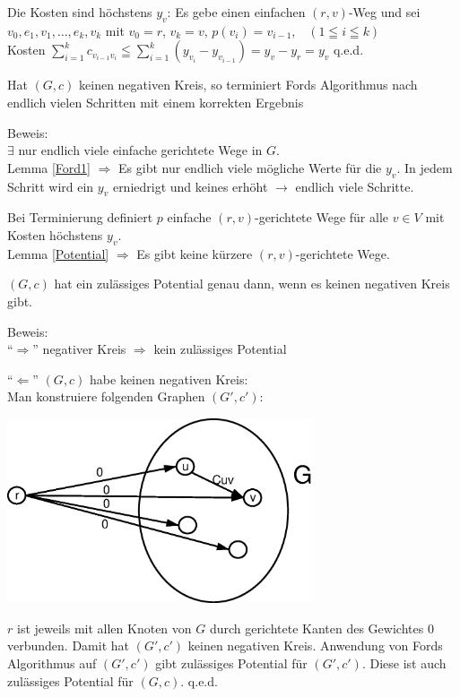 Die Kosten sind höchstens $y_{v}$:
Es gebe einen einfachen $(r,v)$-Weg und sei $v_{0}, e_{1}, v_{1}, \ldots,
e_{k}, v_{k}$ mit $v_{0} = r$, $v_{k}=v$, $p(v_{i}) = v_{i-1}, \; \; \; 
(1 \leqq i \leqq k)$\\
Kosten $\displaystyle \sum_{i=1}^{k} c_{v_{i-1}v_{i}} \leqq  \sum_{i=1}^{k}
(y_{v_{i}} - y_{v_{i-1}}) = y_{v} - y_{r} = y_{v}$ q.e.d.

\begin{satz}
Hat $(G,c)$ keinen negativen Kreis, so terminiert Fords Algorithmus nach
endlich vielen Schritten mit einem korrekten Ergebnis
\end{satz}

Beweis:\\
$\exists$ nur endlich viele einfache gerichtete Wege in $G$.\\
Lemma \ref{Ford1} $\Rightarrow$ Es gibt nur endlich viele mögliche Werte
für die $y_{v}$. In jedem Schritt wird ein $y_{v}$ erniedrigt und keines
erhöht $\rightarrow$ endlich viele Schritte.

Bei Terminierung definiert $p$ einfache $(r,v)$-gerichtete Wege für alle
$v \in V$ mit Kosten höchstens $y_{v}$.\\
Lemma \ref{Potential} $\Rightarrow$ Es gibt keine kürzere
$(r,v)$-gerichtete Wege.

\begin{satz} \label{Potential2}
$(G,c)$ hat ein zulässiges Potential genau dann, wenn es keinen negativen
Kreis gibt.
\end{satz}

Beweis:\\
"`$\Rightarrow$"' negativer Kreis $\Rightarrow$ kein zulässiges Potential

"`$\Leftarrow$"' $(G,c)$ habe keinen negativen Kreis:\\
Man konstruiere folgenden Graphen $(G',c')$:

\includegraphics[width=9cm]{bilder/2-2NegatKreis}

$r$ ist jeweils mit allen Knoten von $G$ durch gerichtete Kanten des
Gewichtes 0 verbunden. Damit hat $(G',c')$ keinen negativen Kreis.
Anwendung von Fords Algorithmus auf $(G',c')$ gibt zulässiges Potential für 
$(G',c')$. Diese ist auch zulässiges Potential für $(G,c)$. q.e.d.

